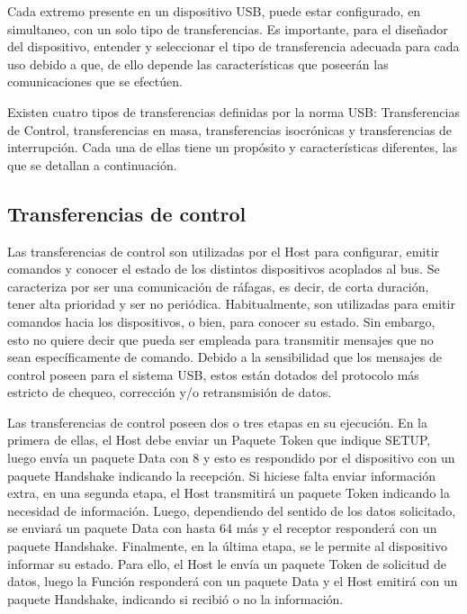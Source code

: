 Cada extremo presente en un dispositivo USB, puede estar configurado, en simultaneo, con un solo tipo de transferencias. Es importante, para el diseñador del dispositivo, entender y seleccionar el tipo de transferencia adecuada para cada uso debido a que, de ello depende las características que poseerán las comunicaciones que se efectúen.%

Existen cuatro tipos de transferencias definidas por la norma USB: Transferencias de Control, transferencias en masa, transferencias isocrónicas y transferencias de interrupción. Cada una de ellas tiene un propósito y características diferentes, las que se detallan a continuación.

\subsection{Transferencias de control}
	
	Las transferencias de control son utilizadas por el Host para configurar, emitir comandos y conocer el estado de los distintos dispositivos acoplados al bus. Se caracteriza por ser una comunicación de ráfagas, es decir, de corta duración, tener alta prioridad y ser no periódica. Habitualmente, son utilizadas para emitir comandos hacia los dispositivos, o bien, para conocer su estado. Sin embargo, esto no quiere decir que pueda ser empleada para transmitir mensajes que no sean específicamente de comando. Debido a la sensibilidad que los mensajes de control poseen para el sistema USB, estos están dotados del protocolo más estricto de chequeo, corrección y/o retransmisión de datos.%
	
	Las transferencias de control poseen dos o tres etapas en su ejecución. En la primera de ellas, el Host debe enviar un Paquete Token que indique SETUP, luego envía un paquete Data con \SI{8}{\byte} y esto es respondido por el dispositivo con un paquete Handshake indicando la recepción. Si hiciese falta enviar información extra, en una segunda etapa, el Host transmitirá un paquete Token indicando la necesidad de información. Luego, dependiendo del sentido de los datos solicitado, se enviará un paquete Data con hasta \SI{64}{\byte} más y el receptor responderá con un paquete Handshake. Finalmente, en la última etapa, se le permite al dispositivo informar su estado. Para ello, el Host le envía un paquete Token de solicitud de datos, luego la Función responderá con un paquete Data y el Host emitirá con un paquete Handshake, indicando si recibió o no la información.
	
